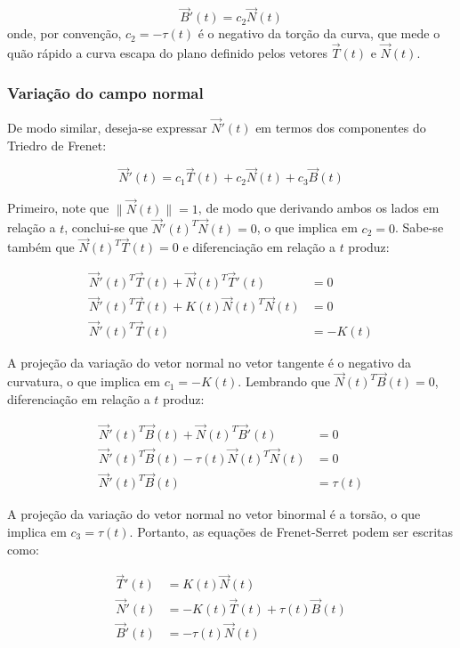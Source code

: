 \documentclass[a4paper,12pt]{article}
\begin{document}
\begin{equation}
	\vec{B}'(t) = c_2 \vec{N}(t)
\end{equation} onde, por convenção, $c_2 = - \tau(t)$ é o negativo da torção da curva, que mede o quão rápido a curva escapa do plano definido pelos vetores $\vec{T}(t)$ e $\vec{N}(t)$.

\subsubsection*{Variação do campo normal}

De modo similar, deseja-se expressar $\vec{N}'(t)$ em termos dos componentes do Triedro de Frenet:

\begin{equation}
	\vec{N}'(t) = c_1 \vec{T}(t) + c_2 \vec{N}(t) + c_3 \vec{B}(t)
\end{equation}

Primeiro, note que $\lVert \vec{N}(t) \rVert = 1$, de modo que derivando ambos os lados em relação a $t$, conclui-se que $\vec{N}'(t)^T \vec{N}(t) = 0$, o que implica em $c_2 = 0$. Sabe-se também que $\vec{N}(t)^T \vec{T}(t) = 0$ e diferenciação em relação a $t$ produz:

\begin{align}
	\vec{N}'(t)^T \vec{T}(t) + \vec{N}(t)^T \vec{T}'(t) & = 0 \\
	\vec{N}'(t)^T \vec{T}(t) + K(t)\vec{N}(t)^T \vec{N}(t) & = 0 \\
	\vec{N}'(t)^T \vec{T}(t) & = -K(t) 
\end{align}

A projeção da variação do vetor normal no vetor tangente é o negativo da curvatura, o que implica em $c_1 = -K(t)$. Lembrando que $\vec{N}(t)^T \vec{B}(t) = 0$, diferenciação em relação a $t$ produz:

\begin{align}
	\vec{N}'(t)^T \vec{B}(t) + \vec{N}(t)^T \vec{B}'(t) & = 0 \\
	\vec{N}'(t)^T \vec{B}(t) - \tau(t)\vec{N}(t)^T \vec{N}(t) & = 0 \\
	\vec{N}'(t)^T \vec{B}(t) & = \tau(t) 
\end{align} 

A projeção da variação do vetor normal no vetor binormal é a torsão, o que implica em $c_3 = \tau(t)$. Portanto, as equações de Frenet-Serret podem ser escritas como:

\begin{align}
	\vec{T}'(t) & = K(t) \vec{N}(t) \\
	\vec{N}'(t) & = -K(t) \vec{T}(t) + \tau(t)\vec{B}(t) \\
	\vec{B}'(t) & = - \tau(t)\vec{N}(t) 
\end{align} 
\end{document}
